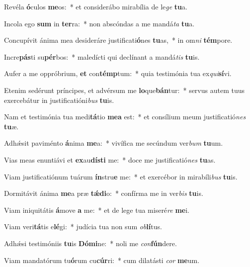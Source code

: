 \item Revéla \textbf{ó}culos \textbf{me}os:~* et considerábo mirabília de le\textit{ge} \textbf{tu}a.
\item Incola ego \textbf{sum} in \textbf{ter}ra:~* non abscóndas a me mandá\textit{ta} \textbf{tu}a.
\item Concupívit ánima mea desideráre justificati\textbf{ó}nes \textbf{tu}as,~* in om\textit{ni} \textbf{tém}pore.
\item Incre\textbf{pás}ti su\textbf{pér}bos:~* maledícti qui declínant a mandá\textit{tis} \textbf{tu}is.
\item Aufer a me oppróbrium, \textbf{et} con\textbf{témp}tum:~* quia testimónia tua ex\textit{qui}\textbf{sí}vi.
\item Etenim sedérunt príncipes, et advérsum me \textbf{lo}que\textbf{bán}tur:~* servus autem tuus exercebátur in justificatióni\textit{bus} \textbf{tu}is.
\item Nam et testimónia tua medi\textbf{tá}tio \textbf{me}\textbf{a} est:~* et consílium meum justificatió\textit{nes} \textbf{tu}æ.
\item Adhǽsit paviménto \textbf{á}nima \textbf{me}a:~* vivífica me secúndum ver\textit{bum} \textbf{tu}um.
\item Vias meas enuntiávi et \textbf{ex}au\textbf{dís}\textbf{ti} me:~* doce me justificatió\textit{nes} \textbf{tu}as.
\item Viam justificatiónum tuárum \textbf{ín}stru\textbf{e} me:~* et exercébor in mirabíli\textit{bus} \textbf{tu}is.
\item Dormitávit ánima \textbf{me}a præ \textbf{tǽ}\textbf{di}o:~* confírma me in ver\textit{bis} \textbf{tu}is.
\item Viam iniquitátis \textbf{á}move \textbf{a} me:~* et de lege tua miseré\textit{re} \textbf{me}i.
\item Viam veri\textbf{tá}tis e\textbf{lé}gi:~* judícia tua non sum \textit{ob}\textbf{lí}tus.
\item Adhǽsi testimóniis \textbf{tu}is \textbf{Dó}\textbf{mi}ne:~* noli me \textit{con}\textbf{fún}dere.
\item Viam mandatórum tu\textbf{ó}rum cu\textbf{cúr}ri:~* cum dilatásti \textit{cor} \textbf{me}um.
